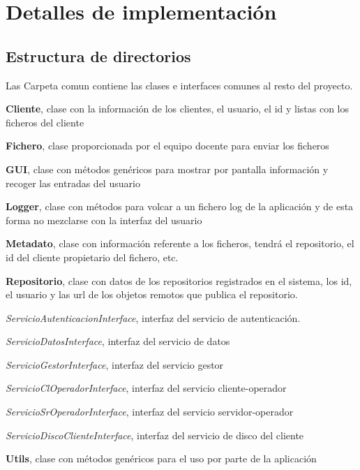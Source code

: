 \chapter{Detalles de implementación}

\section{Estructura de directorios}

Las Carpeta comun contiene las clases e interfaces comunes al resto del proyecto.

\begin{compactitem}
	\item \textbf{Cliente}, clase con la información de los clientes, el usuario, el id y listas con los ficheros del cliente
	\item \textbf{Fichero}, clase proporcionada por el equipo docente para enviar los ficheros
	\item \textbf{GUI}, clase con métodos genéricos para mostrar por pantalla información y recoger las entradas del usuario
	\item \textbf{Logger}, clase con métodos para volcar a un fichero log de la aplicación y de esta forma no mezclarse con la interfaz del usuario
	\item \textbf{Metadato}, clase con información referente a los ficheros, tendrá el repositorio, el id del cliente propietario del fichero, etc.
	\item \textbf{Repositorio}, clase con datos de los repositorios registrados en el sistema, los id, el usuario y las url de los objetos remotos que publica el repositorio.
	\item \textit{ServicioAutenticacionInterface}, interfaz del servicio de autenticación.
	\item \textit{ServicioDatosInterface}, interfaz del servicio de datos
	\item \textit{ServicioGestorInterface}, interfaz del servicio gestor
	\item \textit{ServicioClOperadorInterface}, interfaz del servicio cliente-operador
	\item \textit{ServicioSrOperadorInterface}, interfaz del servicio servidor-operador
	\item \textit{ServicioDiscoClienteInterface}, interfaz del servicio de disco del cliente
	\item \textbf{Utils}, clase con métodos genéricos para el uso por parte de la aplicación
\end{compactitem}

